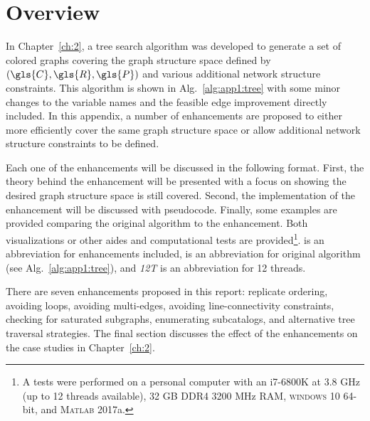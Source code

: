 \section{Overview}

In Chapter~\ref{ch:2}, a tree search algorithm was developed to generate a set of colored graphs covering the graph structure space defined by $(\gls{C},\gls{R},\gls{P})$ and various additional network structure constraints.
This algorithm is shown in Alg.~\ref{alg:app1:tree} with some minor changes to the variable names and the feasible edge improvement directly included.
In this appendix, a number of enhancements are proposed to either more efficiently cover the same graph structure space or allow additional network structure constraints to be defined.



Each one of the enhancements will be discussed in the following format. First, the theory behind the enhancement will be presented with a focus on showing the desired graph structure space is still covered. 
Second, the implementation of the enhancement will be discussed with pseudocode. 
Finally, some examples are provided comparing the original algorithm to the enhancement. Both visualizations or other aides and computational tests are provided\footnote{A tests were performed on a personal computer with an i7-6800K at 3.8 GHz (up to 12 threads available), 32 GB DDR4 3200 MHz RAM, \textsc{windows} 10 64-bit, and \textsc{Matlab} 2017a.}.
\textit{} is an abbreviation for enhancements included, \textit{} is an abbreviation for original algorithm (see Alg.~\ref{alg:app1:tree}), and \textit{12T} is an abbreviation for 12 threads.

There are seven enhancements proposed in this report: replicate ordering, avoiding loops, avoiding multi-edges, avoiding line-connectivity constraints, checking for saturated subgraphs, enumerating subcatalogs, and alternative tree traversal strategies. The final section discusses the effect of the enhancements on the case studies in Chapter~\ref{ch:2}.